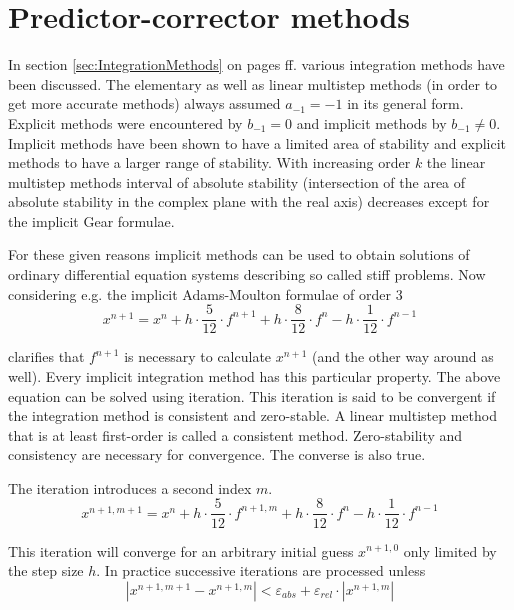 \section{Predictor-corrector methods}

In section \ref{sec:IntegrationMethods} on pages
\pageref{sec:IntegrationMethods} ff. various integration methods have
been discussed.  The elementary as well as linear multistep methods
(in order to get more accurate methods) always assumed $a_{-1} = -1$
in its general form.  Explicit methods were encountered by $b_{-1} =
0$ and implicit methods by $b_{-1} \ne 0$.  Implicit methods have been
shown to have a limited area of stability and explicit methods to have
a larger range of stability.  With increasing order $k$ the linear
multistep methods interval of absolute stability (intersection of the
area of absolute stability in the complex plane with the real axis)
decreases except for the implicit Gear formulae.

\addvspace{12pt}

For these given reasons implicit methods can be used to obtain
solutions of ordinary differential equation systems describing so
called stiff problems.  Now considering e.g. the implicit
Adams-Moulton formulae of order 3
\begin{equation}
\label{eq:AM3}
x^{n+1} = x^{n} + h\cdot \dfrac{5}{12}\cdot f^{n+1} + h\cdot \dfrac{8}{12}\cdot f^{n} - h\cdot \dfrac{1}{12}\cdot f^{n-1}
\end{equation}

clarifies that $f^{n+1}$ is necessary to calculate $x^{n+1}$ (and the
other way around as well).  Every implicit integration method has this
particular property.  The above equation can be solved using
iteration.  This iteration is said to be convergent if the integration
method is consistent and zero-stable.  A linear multistep method that
is at least first-order is called a consistent method.  Zero-stability
and consistency are necessary for convergence.  The converse is also
true.

\addvspace{12pt}

The iteration introduces a second index $m$.
\begin{equation}
\label{eq:AM3iterate}
x^{n+1,m+1} = x^{n} + h\cdot \dfrac{5}{12}\cdot f^{n+1,m} + h\cdot \dfrac{8}{12}\cdot f^{n} - h\cdot \dfrac{1}{12}\cdot f^{n-1}
\end{equation}

This iteration will converge for an arbitrary initial guess
$x^{n+1,0}$ only limited by the step size $h$.  In practice successive
iterations are processed unless
\begin{equation}
\left|x^{n+1,m+1} - x^{n+1,m}\right| < \varepsilon_{abs} + \varepsilon_{rel}\cdot \left|x^{n+1,m}\right|
\end{equation}

